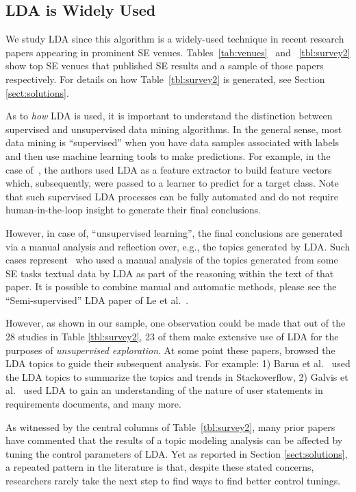\documentclass[twocolumn,5p,sort&compress]{elsarticle}
\newcommand{\tion}[1]{\ref{sect:#1}}
\theoremstyle{break}
\begin{document}
\subsection{LDA is Widely Used}

We study LDA since this algorithm
is a widely-used technique in recent research papers appearing in prominent SE venues.
Tables~\ref{tab:venues}~\cite{sun2016exploring} and ~\ref{tbl:survey2} show top SE venues that published SE results and a sample of those papers respectively. For details on how Table~\ref{tbl:survey2} is generated, see Section \tion{solutions}.

As to {\em how} LDA is used, it is important to understand the distinction between supervised
and unsupervised data mining algorithms. In the general sense, most data mining is ``supervised'' when you have data samples associated with labels and then use machine learning tools to make predictions. For example,  in
the case of~\cite{lohar2013improving, sun2015msr4sm}, the authors used LDA as a feature extractor to build
feature vectors which, subsequently, were passed to a learner to predict for a target class. Note that such
supervised LDA processes can be fully automated and do not require human-in-the-loop insight to 
generate their final conclusions.

However, in case of,
``unsupervised learning'', the final conclusions are generated via a manual analysis and reflection over, e.g.,
the topics generated by LDA.  
Such cases represent~\cite{barua2014developers, hindle2012relating} who used a manual analysis of the topics generated from some SE tasks textual data by LDA as part of the reasoning within the
 text of that paper. It is possible to combine manual and automatic methods, please see the ``Semi-supervised''
 LDA paper of Le et al.~\cite{le2014predicting}.

However, as shown in our sample, one observation could be made that out of the 28 studies in Table \ref{tbl:survey2}, 23 of them make extensive
use of LDA for the purposes of {\em unsupervised exploration}. At some point these papers, browsed the LDA topics to guide their subsequent analysis. For example: 1) Barua et al.~\cite{barua2014developers} used the LDA topics to summarize the topics and trends in Stackoverflow, 2) Galvis et al.~\cite{galvis2013analysis} used LDA to gain an understanding of the nature of user statements in requirements documents, and many more.

As witnessed by the central columns of Table~\ref{tbl:survey2},
many prior papers~\cite{panichella2013effectively,lohar2013improving,sun2015msr4sm} have commented that the results of a topic modeling
analysis can be affected by tuning the control parameters of LDA.
Yet as reported in Section \tion{solutions},
a repeated pattern in the literature is that, despite these
stated concerns, researchers rarely take the next step to find ways to find better control tunings.
\end{document}
